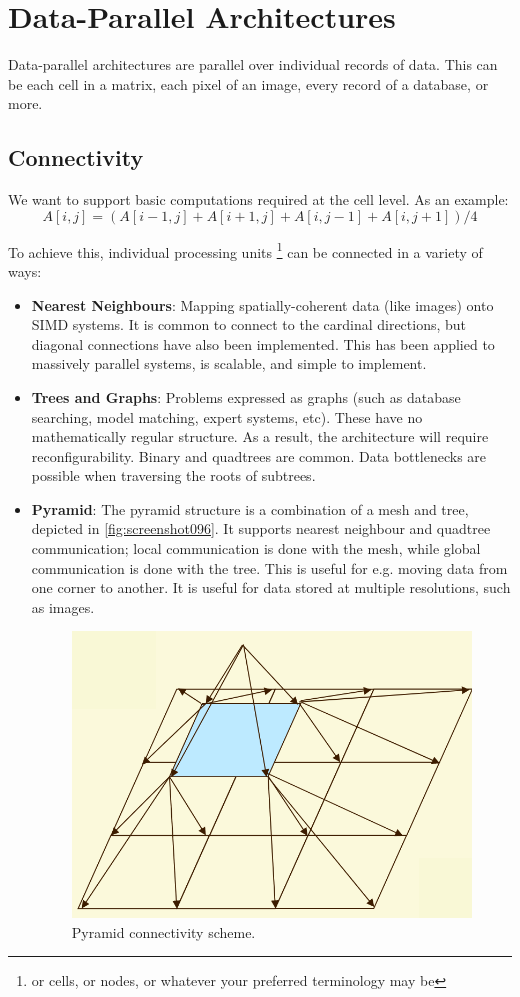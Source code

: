 \chapter{Data-Parallel Architectures}
Data-parallel architectures are parallel over individual records of data. This can be each cell in a matrix, each pixel of an image, every record of a database, or more.

\section{Connectivity}
\label{sec:connectivity}
We want to support basic computations required at the cell level. As an example:
\[ A[i,j] = (A[i-1,j] + A[i+1,j] + A[i,j-1] + A[i,j+1])/4 \]

To achieve this, individual processing units \footnote{or cells, or nodes, or whatever your preferred terminology may be} can be connected in a variety of ways: \begin{itemize}
\item \textbf{Nearest Neighbours}: Mapping spatially-coherent data (like images) onto SIMD systems. It is common to connect to the cardinal directions, but diagonal connections have also been implemented. This has been applied to massively parallel systems, is scalable, and simple to implement.
\item \textbf{Trees and Graphs}: Problems expressed as graphs (such as database searching, model matching, expert systems, etc). These have no mathematically regular structure. As a result, the architecture will require reconfigurability. Binary and quadtrees are common. Data bottlenecks are possible when traversing the roots of subtrees.
\item \textbf{Pyramid}: The pyramid structure is a combination of a mesh and tree, depicted in \autoref{fig:screenshot096}. It supports nearest neighbour and quadtree communication; local communication is done with the mesh, while global communication is done with the tree. This is useful for e.g. moving data from one corner to another. It is useful for data stored at multiple resolutions, such as images.

\begin{figure}
\centering
\includegraphics[width=0.5\linewidth]{screenshot096}
\caption{Pyramid connectivity scheme.}
\label{fig:screenshot096}
\end{figure}


\end{itemize}
